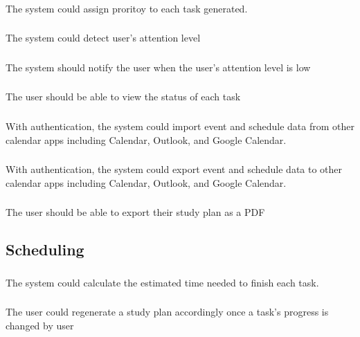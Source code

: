 \documentclass[12pt]{article}
\begin{document}
\subsubsection{}
The system could assign proritoy to each task generated.
\subsubsection{}
The system could detect user's attention level
\subsubsection{}
The system should notify the user when the user's attention level is low
\subsubsection{}
The user should be able to view the status of each task
\subsubsection{}
With authentication, the system could import event and schedule data from other calendar apps including Calendar, Outlook, and Google Calendar.
\subsubsection{}
With authentication, the system could export event and schedule data to other calendar apps including Calendar, Outlook, and Google Calendar.
\subsubsection{}
The user should be able to export their study plan as a PDF


\subsection{Scheduling}

\subsubsection{}
The system could calculate the estimated time needed to finish each task. 
\subsubsection{}
The user could regenerate a study plan accordingly once a task's progress is changed by user
\end{document}

